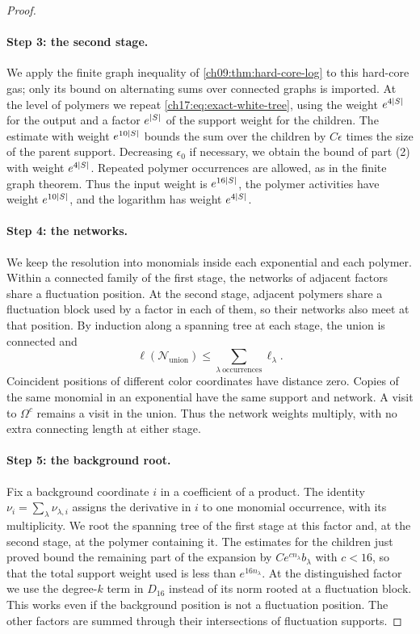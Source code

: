 \begin{proof}
\paragraph{Step 3: the second stage.}
We apply the finite graph inequality of \cref{ch09:thm:hard-core-log} to this hard-core gas; only its bound on alternating sums over connected graphs is imported. At the level of polymers we repeat \eqref{ch17:eq:exact-white-tree}, using the weight $e^{4\lvert S\rvert}$ for the output and a factor $e^{\lvert S\rvert}$ of the support weight for the children. The estimate with weight $e^{10\lvert S\rvert}$ bounds the sum over the children by $C\epsilon$ times the size of the parent support. Decreasing $\epsilon_0$ if necessary, we obtain the bound of part (2) with weight $e^{4\lvert S\rvert}$. Repeated polymer occurrences are allowed, as in the finite graph theorem. Thus the input weight is $e^{16\lvert S\rvert}$, the polymer activities have weight $e^{10\lvert S\rvert}$, and the logarithm has weight $e^{4\lvert S\rvert}$.

\paragraph{Step 4: the networks.}
We keep the resolution into monomials inside each exponential and each polymer. Within a connected family of the first stage, the networks of adjacent factors share a fluctuation position. At the second stage, adjacent polymers share a fluctuation block used by a factor in each of them, so their networks also meet at that position. By induction along a spanning tree at each stage, the union is connected and
\begin{equation}\label{ch17:eq:exact-anchor-union}
 \ell(\mathcal N_{\mathrm{union}})\le\sum_{\lambda\ \mathrm{occurrences}}\ell_\lambda.
\end{equation}
Coincident positions of different color coordinates have distance zero. Copies of the same monomial in an exponential have the same support and network. A visit to $\Omega^c$ remains a visit in the union. Thus the network weights multiply, with no extra connecting length at either stage.

\paragraph{Step 5: the background root.}
Fix a background coordinate $i$ in a coefficient of a product. The identity $\nu_i=\sum_\lambda\nu_{\lambda,i}$ assigns the derivative in $i$ to one monomial occurrence, with its multiplicity. We root the spanning tree of the first stage at this factor and, at the second stage, at the polymer containing it. The estimates for the children just proved bound the remaining part of the expansion by $Ce^{cn_\lambda}b_\lambda$ with $c<16$, so that the total support weight used is less than $e^{16n_\lambda}$. At the distinguished factor we use the degree-$k$ term in $D_{16}$ instead of its norm rooted at a fluctuation block. This works even if the background position is not a fluctuation position. The other factors are summed through their intersections of fluctuation supports.


\end{proof}
